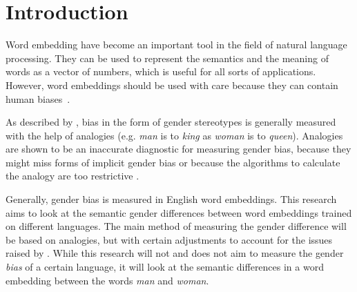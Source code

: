 \section{Introduction}
Word embedding have become an important tool in the field of natural language
processing. They can be used to represent the semantics and the meaning of
words as a vector of numbers, which is useful for all sorts of applications.
However, word embeddings should be used with care because they can contain human
biases~\parencite{caliskan_2017_semantics_language_corpora}.

As described by \textcite{nissim_fair_is_better_2020}, bias in
the form of gender stereotypes is generally measured with the help of analogies (e.g.
\textit{man} is to \textit{king} as \textit{woman} is to \textit{queen}).
Analogies are shown to be an inaccurate diagnostic for measuring gender bias, because
they might miss forms of implicit gender bias \parencite{gonen-goldberg-2019-lipstick-pig}
or because the algorithms to calculate the analogy are too restrictive
\parencite{nissim_fair_is_better_2020}.

Generally, gender bias is measured in English word embeddings. This research aims to
look at the semantic gender differences between word embeddings trained on different
languages. The main method of measuring the gender difference will be based on
analogies, but with certain adjustments to account for the issues raised by
\textcite{nissim_fair_is_better_2020}. While this research will not and does not aim
to measure the gender \textit{bias} of a certain language, it will look at the
semantic differences in a word embedding between the words \textit{man} and \textit{woman}.
